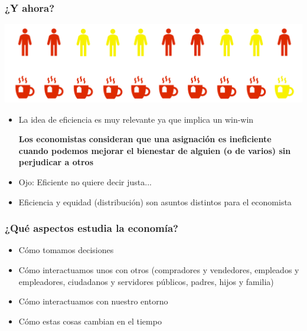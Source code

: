 \documentclass{beamer}
\begin{document}
\begin{frame}
\frametitle{¿Y ahora?}
    \begin{center}
        \includegraphics[scale=0.55]{../Figures/Tazon3.png}
    \end{center}
    \begin{itemize}
        \small
        \item La idea de eficiencia es muy relevante ya que implica un win-win
        \begin{center}
            \begin{boxA} 
                \textbf{Los economistas consideran que una asignación es ineficiente cuando podemos mejorar el bienestar de alguien (o de varios) sin perjudicar a otros}
            \end{boxA}
        \end{center}
        \item Ojo: Eficiente no quiere decir justa...
        \item Eficiencia y equidad (distribución) son asuntos distintos para el economista
    \end{itemize}
\end{frame}

\begin{frame}
\frametitle{¿Qué aspectos estudia la economía?}
\begin{itemize}
    \item Cómo tomamos decisiones  \vspace{2mm}
    \item Cómo interactuamos unos con otros (compradores y vendedores, empleados y empleadores, ciudadanos y servidores públicos, padres, hijos y familia) \vspace{2mm}
    \item Cómo interactuamos con nuestro entorno \vspace{2mm}
    \item Cómo estas cosas cambian en el tiempo  
\end{itemize}
\end{frame}
\end{document}
